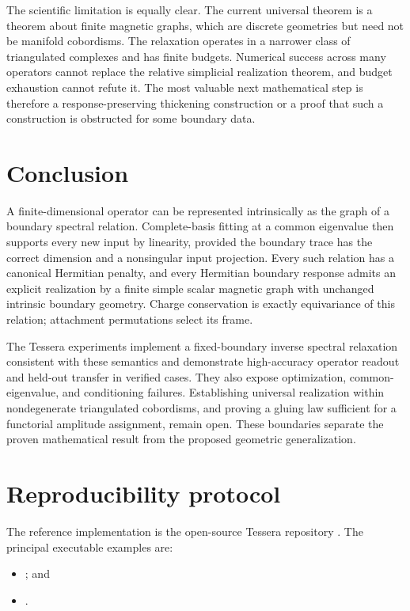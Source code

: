\documentclass[11pt]{article}
\numberwithin{equation}{section}
\theoremstyle{definition}
\theoremstyle{remark}
\begin{document}
The scientific limitation is equally clear.  The current universal theorem is
a theorem about finite magnetic graphs, which are discrete geometries but need
not be manifold cobordisms.  The relaxation operates in a narrower class of
triangulated complexes and has finite budgets.  Numerical success across many
operators cannot replace the relative simplicial realization theorem, and
budget exhaustion cannot refute it.  The most valuable next mathematical step
is therefore a response-preserving thickening construction or a proof that
such a construction is obstructed for some boundary data.

\section{Conclusion}

A finite-dimensional operator can be represented intrinsically as the graph of
a boundary spectral relation.  Complete-basis fitting at a common eigenvalue
then supports every new input by linearity, provided the boundary trace has the
correct dimension and a nonsingular input projection.  Every such relation has
a canonical Hermitian penalty, and every Hermitian boundary response admits an
explicit realization by a finite simple scalar magnetic graph with unchanged
intrinsic boundary geometry.  Charge conservation is exactly equivariance of
this relation; attachment permutations select its frame.

The Tessera experiments implement a fixed-boundary inverse spectral relaxation
consistent with these semantics and demonstrate high-accuracy operator readout
and held-out transfer in verified cases.  They also expose optimization,
common-eigenvalue, and conditioning failures.  Establishing universal
realization within nondegenerate triangulated cobordisms, and proving a gluing
law sufficient for a functorial amplitude assignment, remain open.  These
boundaries separate the proven mathematical result from the proposed geometric
generalization.

\appendix

\section{Reproducibility protocol}

The reference implementation is the open-source Tessera repository
\cite{tessera}.  The principal executable examples are:

\begin{itemize}[leftmargin=2.2em]
  \item {}; and
  \item {}.
\end{itemize}
\end{document}
